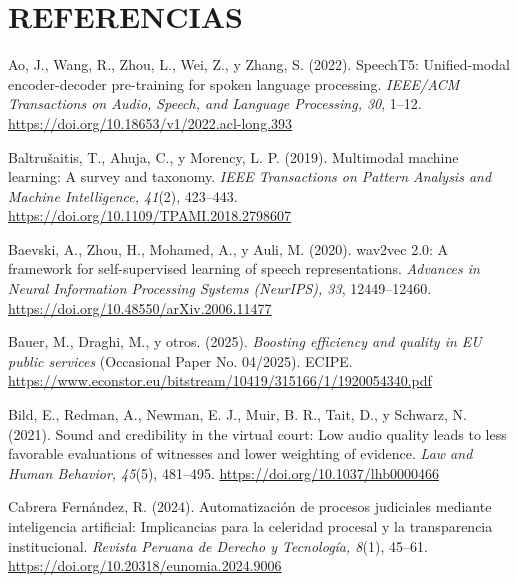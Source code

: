 \documentclass[12pt,a4paper,oneside]{report}
\begin{document}
\chapter*{REFERENCIAS}
\setlength{\parindent}{0pt}
\setlength{\hangindent}{1.25cm}

Ao, J., Wang, R., Zhou, L., Wei, Z., y Zhang, S. (2022). SpeechT5: Unified-modal encoder-decoder pre-training for spoken language processing. \textit{IEEE/ACM Transactions on Audio, Speech, and Language Processing, 30}, 1--12. \url{https://doi.org/10.18653/v1/2022.acl-long.393}

\vspace{6pt}
Baltrušaitis, T., Ahuja, C., y Morency, L. P. (2019). Multimodal machine learning: A survey and taxonomy. \textit{IEEE Transactions on Pattern Analysis and Machine Intelligence, 41}(2), 423--443. \url{https://doi.org/10.1109/TPAMI.2018.2798607}

\vspace{6pt}
Baevski, A., Zhou, H., Mohamed, A., y Auli, M. (2020). wav2vec 2.0: A framework for self-supervised learning of speech representations. \textit{Advances in Neural Information Processing Systems (NeurIPS), 33}, 12449--12460. \url{https://doi.org/10.48550/arXiv.2006.11477}

\vspace{6pt}
Bauer, M., Draghi, M., y otros. (2025). \textit{Boosting efficiency and quality in EU public services} (Occasional Paper No. 04/2025). ECIPE. \url{https://www.econstor.eu/bitstream/10419/315166/1/1920054340.pdf}

\vspace{6pt}
Bild, E., Redman, A., Newman, E. J., Muir, B. R., Tait, D., y Schwarz, N. (2021). Sound and credibility in the virtual court: Low audio quality leads to less favorable evaluations of witnesses and lower weighting of evidence. \textit{Law and Human Behavior, 45}(5), 481--495. \url{https://doi.org/10.1037/lhb0000466}

\vspace{6pt}
Cabrera Fernández, R. (2024). Automatización de procesos judiciales mediante inteligencia artificial: Implicancias para la celeridad procesal y la transparencia institucional. \textit{Revista Peruana de Derecho y Tecnología, 8}(1), 45--61. \url{https://doi.org/10.20318/eunomia.2024.9006}
\end{document}
